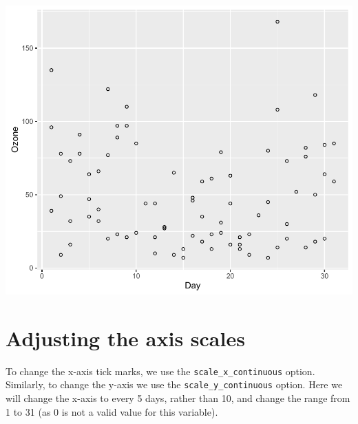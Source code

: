 \begin{Shaded}
\begin{Highlighting}[]
\StringTok{ }\NormalTok{(}  \StringTok{ }\NormalTok{(} \NormalTok{)}
\end{Highlighting}
\end{Shaded}

\begin{center}\includegraphics[width=0.6\linewidth]{5_Scatter_Plots_pdf/scatter_2-1} \end{center}

\section{Adjusting the axis scales}\label{adjusting-the-axis-scales}

To change the x-axis tick marks, we use the
\texttt{scale\_x\_continuous} option. Similarly, to change the y-axis we
use the \texttt{scale\_y\_continuous} option. Here we will change the
x-axis to every 5 days, rather than 10, and change the range from 1 to
31 (as 0 is not a valid value for this variable).

\begin{Shaded}
\begin{Highlighting}[]
\StringTok{ }\StringTok{ }\NormalTok{(} \NormalTok{(}\NormalTok{, }\NormalTok{, }\NormalTok{))}
\end{Highlighting}
\end{Shaded}


